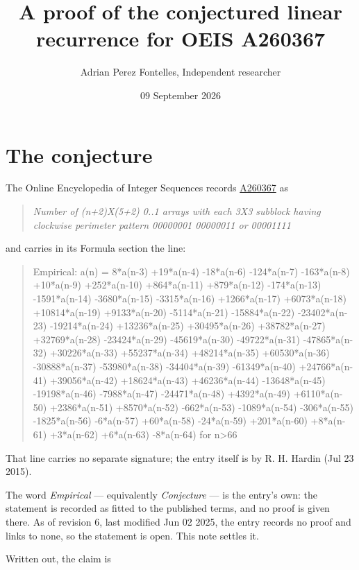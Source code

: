 \documentclass[11pt]{article}
\title{A proof of the conjectured linear recurrence for OEIS A260367}
\author{Adrian Perez Fontelles, Independent researcher}
\date{09 September 2026}
\theoremstyle{definition}
\begin{document}
\maketitle
\section{The conjecture}

The Online Encyclopedia of Integer Sequences records \href{https://oeis.org/A260367}{A260367} as

\begin{quote}\itshape Number of (n+2)X(5+2) 0..1 arrays with each 3X3 subblock having clockwise perimeter pattern 00000001 00000011 or 00001111\end{quote}

and carries in its Formula section the line:

\begin{quote}\ttfamily Empirical: a(n) = 8*a(n-3) +19*a(n-4) -18*a(n-6) -124*a(n-7) -163*a(n-8) +10*a(n-9) +252*a(n-10) +864*a(n-11) +879*a(n-12) -174*a(n-13) -1591*a(n-14) -3680*a(n-15) -3315*a(n-16) +1266*a(n-17) +6073*a(n-18) +10814*a(n-19) +9133*a(n-20) -5114*a(n-21) -15884*a(n-22) -23402*a(n-23) -19214*a(n-24) +13236*a(n-25) +30495*a(n-26) +38782*a(n-27) +32769*a(n-28) -23424*a(n-29) -45619*a(n-30) -49722*a(n-31) -47865*a(n-32) +30226*a(n-33) +55237*a(n-34) +48214*a(n-35) +60530*a(n-36) -30888*a(n-37) -53980*a(n-38) -34404*a(n-39) -61349*a(n-40) +24766*a(n-41) +39056*a(n-42) +18624*a(n-43) +46236*a(n-44) -13648*a(n-45) -19198*a(n-46) -7988*a(n-47) -24471*a(n-48) +4392*a(n-49) +6110*a(n-50) +2386*a(n-51) +8570*a(n-52) -662*a(n-53) -1089*a(n-54) -306*a(n-55) -1825*a(n-56) -6*a(n-57) +60*a(n-58) -24*a(n-59) +201*a(n-60) +8*a(n-61) +3*a(n-62) +6*a(n-63) -8*a(n-64) for n>66\end{quote}

That line carries no separate signature; the entry itself is by R. H. Hardin (Jul 23 2015).

The word {\itshape Empirical} --- equivalently {\itshape Conjecture} --- is the entry's own: the statement is recorded as fitted to the published terms, and no proof is given there. As of revision 6, last modified Jun 02 2025, the entry records no proof and links to none, so the statement is open. This note settles it.

Written out, the claim is
\end{document}
